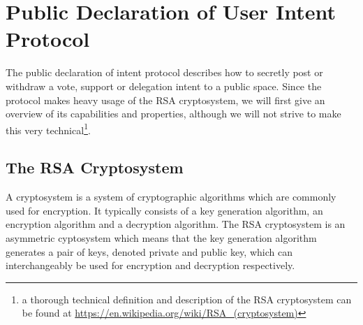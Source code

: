 %
%
%
%
%


\section{Public Declaration of User Intent Protocol}
\label{sec:PublicDeclarationOfIntentProtocol}
The public declaration of intent protocol describes how to secretly post or withdraw a vote, support or delegation intent to a public space.
Since the protocol makes heavy usage of the RSA cryptosystem, we will first give an overview of its capabilities and properties, although we will not strive to make this very technical\footnote{a thorough technical definition and description of the RSA cryptosystem can be found at \url{https://en.wikipedia.org/wiki/RSA_(cryptosystem)}}.

\subsection{The RSA Cryptosystem}
A cryptosystem is a system of cryptographic algorithms which are commonly used for encryption.
It typically consists of a key generation algorithm, an encryption algorithm and a decryption algorithm.
The RSA cryptosystem is an asymmetric cyptosystem which means that the key generation algorithm generates a pair of keys, denoted private and public key, which can interchangeably be used for encryption and decryption respectively.

